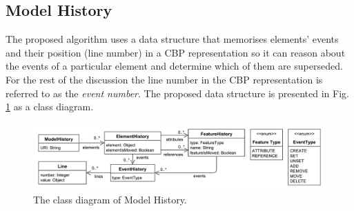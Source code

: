 \documentclass{llncs}
\begin{document}
% 

\subsection{Model History}
\label{subsec:model_history}
The proposed algorithm uses a data structure that memorises elements' events and their position (line number) in a CBP representation so it can reason about the events of a particular element and determine which of them are superseded.
For the rest of the discussion the line number in the CBP representation is referred to as the \emph{event number}.
The proposed data structure is presented in Fig. \ref{fig:object_history} as a class diagram.  


\begin{figure}[ht]
\centering
\includegraphics[width=\linewidth]{object_history}
\caption{The class diagram of Model History.}
\label{fig:object_history}
\end{figure}
\end{document}

